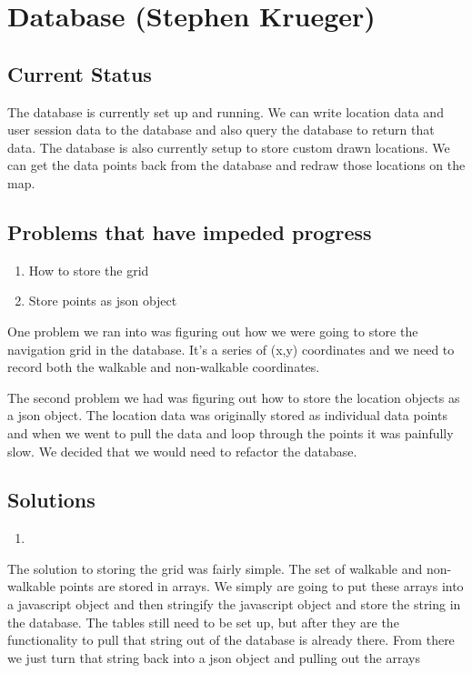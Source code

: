 \documentclass[letterpaper,10pt,titlepage, onecolumn, compsoc]{IEEEtran}
\begin{document}
\section{Database (Stephen Krueger)}
\subsection{Current Status}
The database is currently set up and running. We can write location data and user session data to the database and also query the database to return that data. The database is also currently setup to store custom drawn locations. We can get the data points back from the database and redraw those locations on the map.

\subsection{Problems that have impeded progress}
\begin{enumerate}
	\item How to store the grid
    \item Store points as json object
\end{enumerate}
One problem we ran into was figuring out how we were going to store the navigation grid in the database. It’s a series of (x,y) coordinates and we need to record both the walkable and non-walkable coordinates. 

The second problem we had was figuring out how to store the location objects as a json object. The location data was originally stored as individual data points and when we went to pull the data and loop through the points it was painfully slow. We decided that we would need to refactor the database.

\subsection{Solutions}
\begin{enumerate}
	\item 
\end{enumerate}
The solution to storing the grid was fairly simple. The set of walkable and non-walkable points are stored in arrays. We simply are going to put these arrays into a javascript object and then stringify the javascript object and store the string in the database. The tables still need to be set up, but after they are the functionality to pull that string out of the database is already there. From there we just turn that string back into a json object and pulling out the arrays
\end{document}
